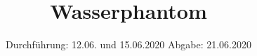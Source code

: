 

\subject{TPS Praktikum}
\title{Wasserphantom}
\date{%
	Durchführung: 12.06. und 15.06.2020
	\hspace{3em}
	Abgabe: 21.06.2020
}



\maketitle
\thispagestyle{empty}
\tableofcontents
\newpage
\setlength{\parindent}{0em}





\newpage
\printbibliography{}
\nocite{*}



